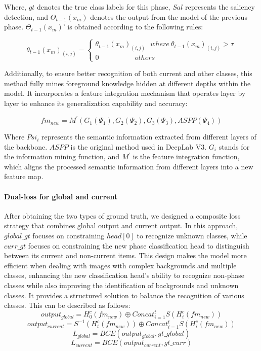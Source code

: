 {Where, \(gt\) denotes the true class labels for this phase, \(Sal\) represents the saliency detection, and \( \Theta_{t-1}(x_{m})\) denotes the output from the model of the previous phase.  \( \Theta_{t-1}(x_{m})\)' is obtained according to the following rules:

\[\theta_{t-1}(x_m)_{(i,j)}=\begin{cases}\theta_{t-1}(x_m)_{(i,j)}~~~where~\theta_{t-1}(x_m)_{(i,j)}>\tau\\0~~~~~~~~~~~~~~~~~~~~~~~others\end{cases}\]

Additionally, to ensure better recognition of both current and other classes, this method fully mines foreground knowledge hidden at different depths within the model. It incorporates a feature integration mechanism that operates layer by layer to enhance its generalization capability and accuracy:

\begin{equation}
    {fm}_{{new}}={M}^{'}({G}_{1}(\Psi_{1}),G_{2}(\Psi_{2}),G_{3}(\Psi_{3}), ASPP(\Psi_{4}))
\end{equation}


Where $Psi_{i}$ represents the semantic information extracted from different layers of the backbone. $ASPP$ is the original method used in DeepLab V3. $G_{i}$ stands for the information mining function, and $M^{'}$ is the feature integration function, which aligns the processed semantic information from different layers into a new feature map.

\paragraph{Dual-loss for global and current}
After obtaining the two types of ground truth, we designed a composite loss strategy that combines global output and current output. In this approach, \(global\_gt\) focuses on constraining \(head[0]\) to recognize unknown classes, while \(curr\_gt\) focuses on constraining the new phase classification head to distinguish between its current and non-current items. This design makes the model more efficient when dealing with images with complex backgrounds and multiple classes, enhancing the new classification head's ability to recognize non-phase classes while also improving the identification of backgrounds and unknown classes. It provides a structured solution to balance the recognition of various classes. This can be described as follows:
\[output_{global}=H_0^c(fm_{new})\oplus Concat_{i=1}^tS(H_i^c(fm_{new}))\]
\[output_{current}=S^{-1}(H_t^c(fm_{new}))\oplus Concat_{i=1}^tS(H_i^c(fm_{new}))\]
\[L_{global}=BCE(output_{global},gt\_global)\]
\[L_{current}=BCE( output_{current} , gt\_curr)\]

}
